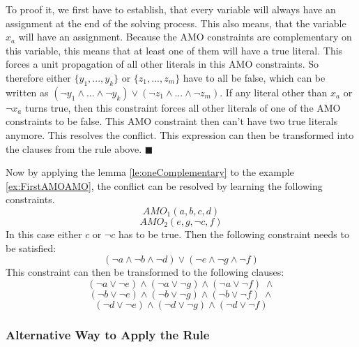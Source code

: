 To proof it, we first have to establish, that every variable will always have an assignment at the end of the solving process. This also means, that the variable $x_a$ will have an assignment. Because the AMO constraints are complementary on this variable, this means that at least one of them will have a true literal. This forces a unit propagation of all other literals in this AMO constraints. So therefore either $\{y_1,...,y_k\}$ or $\{z_1,...,z_m\}$ have to all be false, which can be written as $(\neg y_1 \wedge ... \wedge \neg y_k) \vee (\neg z_1 \wedge ... \wedge \neg z_m)$. If any literal other than $x_a$ or $\neg x_a$ turns true, then this constraint forces all other literals of one of the AMO constraints to be false. This AMO constraint then can't have two true literals anymore. This resolves the conflict. This expression can then be transformed into the clauses from the rule above. $\blacksquare$

Now by applying the lemma \ref{le:oneComplementary} to the example \ref{ex:FirstAMOAMO}, the conflict can be resolved by learning the following constraints.
\begin{displaymath}
AMO_1(a,b,c,d)
\end{displaymath}
\begin{displaymath}
AMO_2(e,g,\neg c,f)
\end{displaymath}
In this case either $c$ or $\neg c$ has to be true. Then the following constraint needs to be satisfied:
\begin{displaymath}
(\neg a \wedge \neg b \wedge \neg d) \vee (\neg e \wedge \neg g \wedge \neg f)
\end{displaymath}
This constraint can then be transformed to the following clauses:
\begin{displaymath}
(\neg a \vee \neg e) \wedge (\neg a \vee \neg g) \wedge (\neg a \vee \neg f) \; \wedge
\end{displaymath}
\begin{displaymath}
(\neg b \vee \neg e) \wedge (\neg b \vee \neg g) \wedge (\neg b \vee \neg f) \; \wedge
\end{displaymath}
\begin{displaymath}
(\neg d \vee \neg e) \wedge (\neg d \vee \neg g) \wedge (\neg d \vee \neg f)
\end{displaymath}

\subsubsection{Alternative Way to Apply the Rule}

